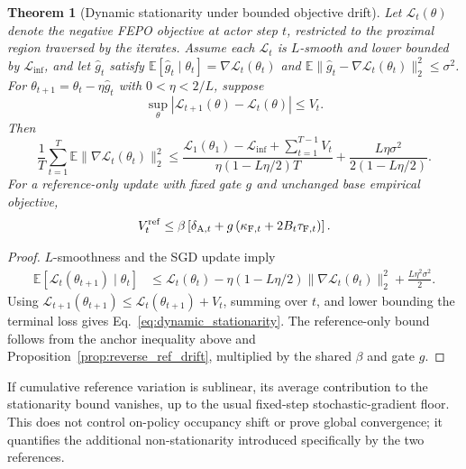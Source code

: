 \documentclass{article}
\newcommand{\E}{\mathbb{E}}
\newtheorem{theorem}{Theorem}
\begin{document}
\begin{theorem}[Dynamic stationarity under bounded objective drift]
\label{thm:dynamic_stationarity}
Let $\mathcal L_t(\theta)$ denote the negative FEPO objective at actor step $t$, restricted to the proximal region traversed by the iterates. Assume each $\mathcal L_t$ is $L$-smooth and lower bounded by $\mathcal L_{\inf}$, and let $\widehat g_t$ satisfy $\E[\widehat g_t\mid\theta_t]=\nabla\mathcal L_t(\theta_t)$ and $\E\|\widehat g_t-\nabla\mathcal L_t(\theta_t)\|_2^2\le\sigma^2$. For $\theta_{t+1}=\theta_t-\eta\widehat g_t$ with $0<\eta<2/L$, suppose
\begin{equation}
\sup_\theta |\mathcal L_{t+1}(\theta)-\mathcal L_t(\theta)|\le V_t.
\end{equation}
Then
\begin{equation}
\frac1T\sum_{t=1}^{T}\E\|\nabla\mathcal L_t(\theta_t)\|_2^2
\le
\frac{\mathcal L_1(\theta_1)-\mathcal L_{\inf}+\sum_{t=1}^{T-1}V_t}
{\eta(1-L\eta/2)T}
+\frac{L\eta\sigma^2}{2(1-L\eta/2)}.
\label{eq:dynamic_stationarity}
\end{equation}
For a reference-only update with fixed gate $g$ and unchanged base empirical objective,
\begin{equation}
V_t^{\rm ref}\le\beta\left[\delta_{\mathrm A,t}+g\left(\kappa_{\mathrm F,t}+2B_t\tau_{\mathrm F,t}\right)\right].
\label{eq:reverse_dynamic_ref}
\end{equation}
\end{theorem}
\begin{proof}
$L$-smoothness and the SGD update imply
\begin{align}
\E[\mathcal L_t(\theta_{t+1})\mid\theta_t]
&\le \mathcal L_t(\theta_t)-\eta(1-L\eta/2)\|\nabla\mathcal L_t(\theta_t)\|_2^2+\frac{L\eta^2\sigma^2}{2}.
\end{align}
Using $\mathcal L_{t+1}(\theta_{t+1})\le\mathcal L_t(\theta_{t+1})+V_t$, summing over $t$, and lower bounding the terminal loss gives Eq.~\eqref{eq:dynamic_stationarity}. The reference-only bound follows from the anchor inequality above and Proposition~\ref{prop:reverse_ref_drift}, multiplied by the shared $\beta$ and gate $g$.
\end{proof}
If cumulative reference variation is sublinear, its average contribution to the stationarity bound vanishes, up to the usual fixed-step stochastic-gradient floor. This does not control on-policy occupancy shift or prove global convergence; it quantifies the additional non-stationarity introduced specifically by the two references.
\end{document}
